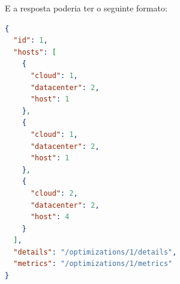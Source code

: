 E a resposta poderia ter o seguinte formato:

\begin{lstlisting}[language=json,firstnumber=1]
{
  "id": 1,
  "hosts": [
    {
      "cloud": 1,
      "datacenter": 2,
      "host": 1
    }, 
    {
      "cloud": 1,
      "datacenter": 2,
      "host": 1
    }, 
    {
      "cloud": 2,
      "datacenter": 2,
      "host": 4
    }
  ],
  "details": "/optimizations/1/details",
  "metrics": "/optimizations/1/metrics"
}
\end{lstlisting}
